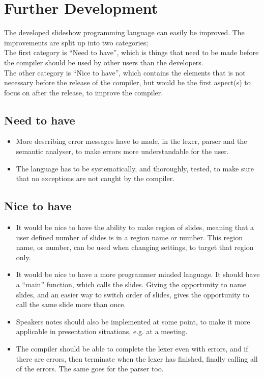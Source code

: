 \chapter{Further Development}
\label{sec:furtherdev}
The developed slideshow programming language can easily be improved. The improvements are split up into two categories; \\
The first category is ``Need to have'', which is things that need to be made before the compiler should be used by other users than the developers. \\
The other category is ``Nice to have'', which contains the elements that is not necessary before the release of the compiler, but would be the first aspect(s) to focus on after the release, to improve the compiler.

\section{Need to have}
\begin{itemize}
	\item More describing error messages have to made, in the lexer, parser and the semantic analyser, to make errors more understandable for the user.
	\item The language has to be systematically, and thoroughly, tested, to make sure that no exceptions are not caught by the compiler.
\end{itemize}

\section{Nice to have}
\begin{itemize}
	\item It would be nice to have the ability to make region of slides, meaning that a user defined number of slides is in a region name or number. This region name, or number, can be used when changing settings, to target that region only.
	\item It would be nice to have a more programmer minded language. It should have a ``main'' function, which calls the slides. Giving the opportunity to name slides, and an easier way to switch order of slides, gives the opportunity to call the same slide more than once.
	\item Speakers notes should also be implemented at some point, to make it more applicable in presentation situations, e.g. at a meeting.
	\item The compiler should be able to complete the lexer even with errors, and if there are errors, then terminate when the lexer has finished, finally calling all of the errors. The same goes for the parser too.
\end{itemize}